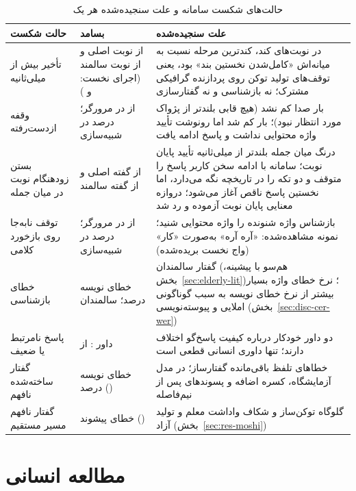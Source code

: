 \begin{table}[ht]
\centering
\caption{حالت‌های شکست سامانه و علت سنجیده‌شده هر یک}
\label{tab:errors}
\small
\begin{tabular}{L{3.2cm}L{3.3cm}L{6.2cm}}
\toprule
\textbf{حالت شکست} & \textbf{بسامد} & \textbf{علت سنجیده‌شده} \\
\midrule
تأخیر بیش از  میلی‌ثانیه &  از  نوبت اصلی و  از  نوبت سالمند (اجرای نخست:  و ) &
  در نوبت‌های کند، کندترین مرحله نسبت به میانه‌اش «کامل‌شدن نخستین بند» بود، یعنی
  توقف‌های تولید توکن روی پردازنده گرافیکی مشترک؛ نه بازشناسی و نه گفتارسازی \\
وقفه ازدست‌رفته &  از  در مرورگر؛  درصد در شبیه‌سازی &
   بار صدا کم نشد (هیچ قابی بلندتر از پژواک مورد انتظار نبود)؛  بار کم شد
  اما رونوشت تأیید واژه محتوایی نداشت و پاسخ ادامه یافت \\
بستن زودهنگام نوبت در میان جمله &  از  گفته اصلی و  از  گفته سالمند &
  درنگ میان جمله بلندتر از  میلی‌ثانیه تأیید پایان نوبت؛ سامانه با ادامه
  سخن کاربر پاسخ را متوقف و دو تکه را در تاریخچه نگه می‌دارد، اما نخستین پاسخ
  ناقص آغاز می‌شود؛ دروازه معنایی پایان نوبت آزموده و رد شد \\
توقف نابه‌جا روی بازخورد کلامی &  از  در مرورگر؛  درصد در شبیه‌سازی &
  بازشناس واژه شنونده را واژه محتوایی شنید؛ نمونه مشاهده‌شده: «آره آره» به‌صورت
  «کار» (واج نخست بریده‌شده) \\
خطای بازشناسی & خطای نویسه  درصد؛ سالمندان  &
  گفتار سالمندان (هم‌سو با پیشینه، بخش~\ref{sec:elderly-lit})؛ نرخ خطای واژه بسیار
  بیشتر از نرخ خطای نویسه به سبب گوناگونی املایی و پیوسته‌نویسی
  (بخش~\ref{sec:disc-cer-wer}) \\
پاسخ نامرتبط یا ضعیف & داور :  از  &
  دو داور خودکار درباره کیفیت پاسخ‌گو اختلاف دارند؛ تنها داوری انسانی قطعی است \\
گفتار ساخته‌شده نافهم & خطای نویسه  درصد () &
  خطاهای تلفظ باقی‌مانده گفتارساز؛ در مدل  آزمایشگاه، کسره اضافه و
  پسوندهای پس از نیم‌فاصله \\
گفتار نافهم مسیر مستقیم & خطای پیشوند  () &
  گلوگاه توکن‌ساز و شکاف واداشت معلم و تولید آزاد (بخش~\ref{sec:res-moshi}) \\
\bottomrule
\end{tabular}
\end{table}

\section{مطالعه انسانی}
\label{sec:res-study}

